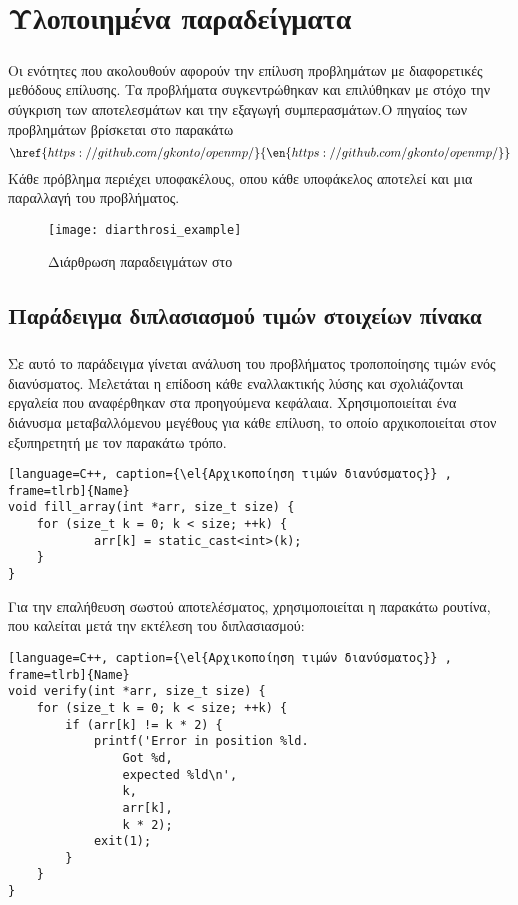 \section{Υλοποιημένα παραδείγματα}
\subparagraph{}
Οι ενότητες που ακολουθούν αφορούν την επίλυση προβλημάτων με διαφορετικές μεθόδους επίλυσης. Τα προβλήματα συγκεντρώθηκαν και επιλύθηκαν με στόχο την σύγκριση των αποτελεσμάτων και την εξαγωγή συμπερασμάτων.Ο πηγαίος των προβλημάτων βρίσκεται στο παρακάτω  $$\href{https://github.com/gkonto/openmp/}{\en{https://github.com/gkonto/openmp/}}$$
Κάθε πρόβλημα περιέχει υποφακέλους, οπου κάθε υποφάκελος αποτελεί και μια παραλλαγή του προβλήματος.
\begin{center}

\begin{figure}[h]
\texttt{[image: diarthrosi\_example]}
\captionsetup{justification=centering, singlelinecheck=false}
\caption{Διάρθρωση παραδειγμάτων στο }
\label{fig:diarthrosi_example}
\end{figure}
\end{center}


\subsection{Παράδειγμα διπλασιασμού τιμών στοιχείων πίνακα}
\subparagraph{}
Σε αυτό το παράδειγμα γίνεται ανάλυση του προβλήματος τροποποίησης τιμών ενός διανύσματος. Μελετάται η επίδοση κάθε εναλλακτικής λύσης και σχολιάζονται εργαλεία που αναφέρθηκαν στα προηγούμενα κεφάλαια. Χρησιμοποιείται ένα διάνυσμα μεταβαλλόμενου μεγέθους για κάθε επίλυση, το οποίο αρχικοποιείται στον εξυπηρετητή με τον παρακάτω τρόπο.
\begin{lstlisting}[language=C++, caption={\el{Αρχικοποίηση τιμών διανύσματος}} , frame=tlrb]{Name}
void fill_array(int *arr, size_t size) {
    for (size_t k = 0; k < size; ++k) {
            arr[k] = static_cast<int>(k);
    }
}
\end{lstlisting}

Για την επαλήθευση σωστού αποτελέσματος, χρησιμοποιείται η παρακάτω ρουτίνα, που καλείται μετά την εκτέλεση του διπλασιασμού:

\begin{lstlisting}[language=C++, caption={\el{Αρχικοποίηση τιμών διανύσματος}} , frame=tlrb]{Name}
void verify(int *arr, size_t size) {
	for (size_t k = 0; k < size; ++k) {
		if (arr[k] != k * 2) {
        	printf('Error in position %ld.
        		Got %d, 
        		expected %ld\n', 
        		k, 
        		arr[k], 
        		k * 2);
			exit(1);
		}
	}
}
\end{lstlisting}

